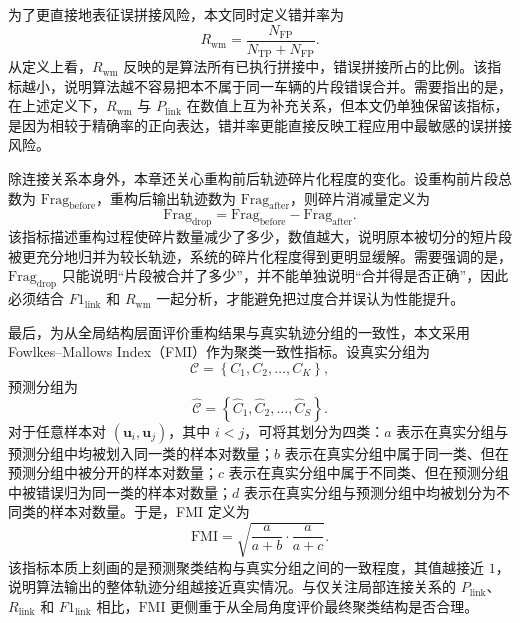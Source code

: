 \documentclass{xdupgthesis}
\begin{document}
为了更直接地表征误拼接风险，本文同时定义错并率为
\begin{equation}
	R_{\mathrm{wm}}
	=
	\frac{N_{\mathrm{FP}}}{N_{\mathrm{TP}}+N_{\mathrm{FP}}}.
\end{equation}
从定义上看，$R_{\mathrm{wm}}$ 反映的是算法所有已执行拼接中，错误拼接所占的比例。该指标越小，说明算法越不容易把本不属于同一车辆的片段错误合并。需要指出的是，在上述定义下，$R_{\mathrm{wm}}$ 与 $P_{\mathrm{link}}$ 在数值上互为补充关系，但本文仍单独保留该指标，是因为相较于精确率的正向表达，错并率更能直接反映工程应用中最敏感的误拼接风险。

除连接关系本身外，本章还关心重构前后轨迹碎片化程度的变化。设重构前片段总数为 $\mathrm{Frag}_{\mathrm{before}}$，重构后输出轨迹数为 $\mathrm{Frag}_{\mathrm{after}}$，则碎片消减量定义为
\begin{equation}
	\mathrm{Frag}_{\mathrm{drop}}
	=
	\mathrm{Frag}_{\mathrm{before}}-\mathrm{Frag}_{\mathrm{after}}.
\end{equation}
该指标描述重构过程使碎片数量减少了多少，数值越大，说明原本被切分的短片段被更充分地归并为较长轨迹，系统的碎片化程度得到更明显缓解。需要强调的是，$\mathrm{Frag}_{\mathrm{drop}}$ 只能说明“片段被合并了多少”，并不能单独说明“合并得是否正确”，因此必须结合 $F1_{\mathrm{link}}$ 和 $R_{\mathrm{wm}}$ 一起分析，才能避免把过度合并误认为性能提升。

最后，为从全局结构层面评价重构结果与真实轨迹分组的一致性，本文采用 Fowlkes--Mallows Index（FMI）作为聚类一致性指标。设真实分组为
\begin{equation}
	\mathcal{C}
	=
	\left\{C_1,C_2,\ldots,C_K\right\},
\end{equation}
预测分组为
\begin{equation}
	\hat{\mathcal{C}}
	=
	\left\{\hat{C}_1,\hat{C}_2,\ldots,\hat{C}_S\right\}.
\end{equation}
对于任意样本对 $\left(\mathbf{u}_i,\mathbf{u}_j\right)$，其中 $i<j$，可将其划分为四类：$a$ 表示在真实分组与预测分组中均被划入同一类的样本对数量；$b$ 表示在真实分组中属于同一类、但在预测分组中被分开的样本对数量；$c$ 表示在真实分组中属于不同类、但在预测分组中被错误归为同一类的样本对数量；$d$ 表示在真实分组与预测分组中均被划分为不同类的样本对数量。于是，FMI 定义为
\begin{equation}
	\mathrm{FMI}
	=
	\sqrt{
		\frac{a}{a+b}
		\cdot
		\frac{a}{a+c}
	}.
\end{equation}
该指标本质上刻画的是预测聚类结构与真实分组之间的一致程度，其值越接近 $1$，说明算法输出的整体轨迹分组越接近真实情况。与仅关注局部连接关系的 $P_{\mathrm{link}}$、$R_{\mathrm{link}}$ 和 $F1_{\mathrm{link}}$ 相比，$\mathrm{FMI}$ 更侧重于从全局角度评价最终聚类结构是否合理。
\end{document}
